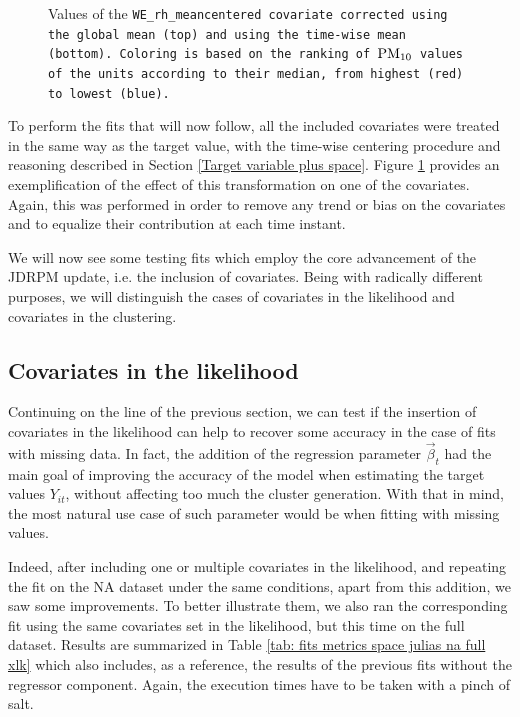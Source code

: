 \documentclass[12pt,	%
	a4paper,		%
	twoside,		%
	openright,		%
	titlepage,%
	]{book}
\theoremstyle{definition}
\begin{document}
\begin{figure}[!ht]
    \caption[Comparison of the two possible mean centering methods on a covariate]{Values of the \tt{WE\_rh\_meancentered} covariate corrected using the global mean (top) and using the time-wise mean (bottom). Coloring is based on the ranking of $\text{PM}_{10}$ values of the units according to their median, from highest (red) to lowest (blue).}
    \label{fig:different mean correection covariate blh}
\end{figure}

To perform the fits that will now follow, all the included covariates were treated in the same way as the target value, with the time-wise centering procedure and reasoning described in Section \ref{Target variable plus space}. Figure \ref{fig:different mean correection covariate blh} provides an exemplification of the effect of this transformation on one of the covariates.
Again, this was performed in order to remove any trend or bias on the covariates and to equalize their contribution at each time instant.

We will now see some testing fits which employ the core advancement of the JDRPM update, i.e. the inclusion of covariates. Being with radically different purposes, we will distinguish the cases of covariates in the likelihood and covariates in the clustering. 

\subsection{Covariates in the likelihood}
\label{Covariates in the likelihood}
Continuing on the line of the previous section, we can test if the insertion of covariates in the likelihood can help to recover some accuracy in the case of fits with missing data. In fact, the addition of the regression parameter $\vec{\beta}_t$ had the main goal of improving the accuracy of the model when estimating the target values $Y_{it}$, without affecting too much the cluster generation. With that in mind, the most natural use case of such parameter would be when fitting with missing values. 

Indeed, after including one or multiple covariates in the likelihood, and repeating the fit on the NA dataset under the same conditions, apart from this addition, we saw some improvements. To better illustrate them, we also ran the corresponding fit using the same covariates set in the likelihood, but this time on the full dataset. Results are summarized in Table \ref{tab: fits metrics space julias na full xlk} which also includes, as a reference, the results of the previous fits without the regressor component. Again, the execution times have to be taken with a pinch of salt.
\end{document}
